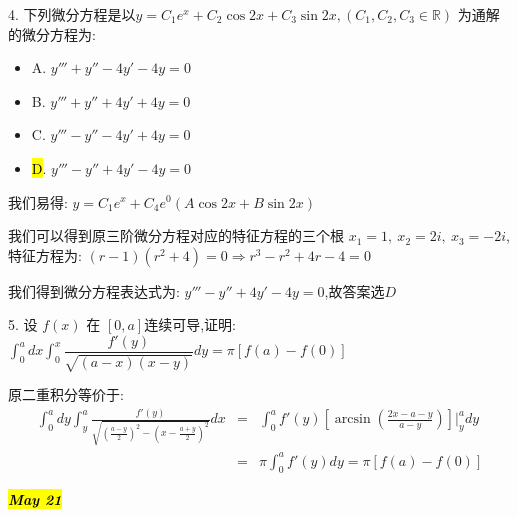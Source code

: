 4. 下列微分方程是以$y=C_{1}e^x+C_{2}\cos 2x+C_{3}\sin 2x,(C_{1},C_{2},C_{3}\in \mathbb{R})$ 为通解的微分方程为: 
\begin{itemize}
	\item A. $y'''+y''-4y'-4y=0$
	\item B. $y'''+y''+4y'+4y=0$
	\item C. $y'''-y''-4y'+4y=0$
	\item \hl{D}. $y'''-y''+4y'-4y=0$
\end{itemize}
\begin{solution}
	
	我们易得: $y=C_{1}e^{x}+C_{4}e^{0}(A\cos 2x+B\sin 2x)$
	
	我们可以得到原三阶微分方程对应的特征方程的三个根 $x_{1}=1,\ x_{2}=2i,\ x_{3}=-2i$,特征方程为: $(r-1)(r^2+4)=0\Rightarrow r^3-r^2+4r-4=0$
	
	我们得到微分方程表达式为: $y'''-y''+4y'-4y=0$,故答案选$D$
\end{solution}


5. 设 $f(x)$ 在 $[0,a]$连续可导,证明: $\int_{0}^{a}dx\int_{0}^{x}\dfrac{f'(y)}{\sqrt{(a-x)(x-y)}}dy=\pi[f(a)-f(0)]$
\begin{solution}
	
	原二重积分等价于: 
	\begin{eqnarray*}
		\int_{0}^{a}dy\int_{y}^{a}\frac{f'(y)}{\sqrt{(\frac{a-y}{2})^2-(x-\frac{a+y}{2})^2}}dx&=&\int_{0}^{a}f'(y)[\arcsin (\frac{2x-a-y}{a-y})]|_{y}^{a}dy\\
		&=&\pi\int_{0}^{a}f'(y)dy=\pi[f(a)-f(0)]
	\end{eqnarray*}
	
\end{solution}


\hl{\textbf{\textit{May 21}}}

